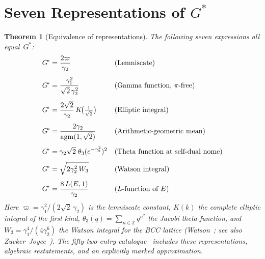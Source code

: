 \documentclass[12pt,reqno]{amsart}
\newtheorem{theorem}{Theorem}[section]
\theoremstyle{definition}
\theoremstyle{remark}
\newcommand{\ZZ}{\mathbb{Z}}
\newcommand{\Gstar}{G^{\!*}}
\newcommand{\varpiup}{\varpi}
\newcommand{\agm}{\operatorname{agm}}
\begin{document}
\section{Seven Representations of \texorpdfstring{$\Gstar$}{G*}}\label{sec:derivations}

\begin{theorem}[Equivalence of representations]\label{thm:seven}
The following seven expressions all equal~$\Gstar$:
\begin{align}
  \Gstar &= \frac{2\varpiup}{\gamma_{2}}
    &&\textup{(Lemniscate)}\label{eq:D1}\\[4pt]
  \Gstar &= \frac{\gamma_{1}^{2}}{\sqrt{2}\,\gamma_{2}^{2}}
    &&\textup{(Gamma function, $\pi$-free)}\label{eq:D2}\\[4pt]
  \Gstar &= \frac{2\sqrt{2}}{\gamma_{2}}\,K\!\bigl(\tfrac{1}{\sqrt{2}}\bigr)
    &&\textup{(Elliptic integral)}\label{eq:D3}\\[4pt]
  \Gstar &= \frac{2\gamma_{2}}{\agm(1,\sqrt{2})}
    &&\textup{(Arithmetic-geometric mean)}\label{eq:D4}\\[4pt]
  \Gstar &= \gamma_{2}\sqrt{2}\;\theta_{3}(e^{-\gamma_{2}^{2}})^{2}
    &&\textup{(Theta function at self-dual nome)}\label{eq:D5}\\[4pt]
  \Gstar &= \sqrt{2\gamma_{2}^{2}\,W_{3}}
    &&\textup{(Watson integral)}\label{eq:D6}\\[4pt]
  \Gstar &= \frac{8\,L(E,1)}{\gamma_{2}}
    &&\textup{($L$-function of $E$)}\label{eq:D7}
\end{align}
Here $\varpiup = \gamma_{1}^{2}/(2\sqrt{2}\,\gamma_{2})$ is the lemniscate
constant, $K(k)$ the complete elliptic integral of the first kind,
$\theta_{3}(q) = \sum_{n\in\ZZ}q^{n^{2}}$ the Jacobi theta function, and
$W_{3} = \gamma_{1}^{4}/(4\gamma_{2}^{6})$ the Watson integral for the BCC
lattice \textup{(Watson~\cite{Watson}; see also
Zucker--Joyce~\cite{ZuckerJoyce})}.
The fifty-two-entry catalogue~\cite{Paper2} includes these representations,
algebraic restatements, and an explicitly marked approximation.
\end{theorem}
\end{document}
